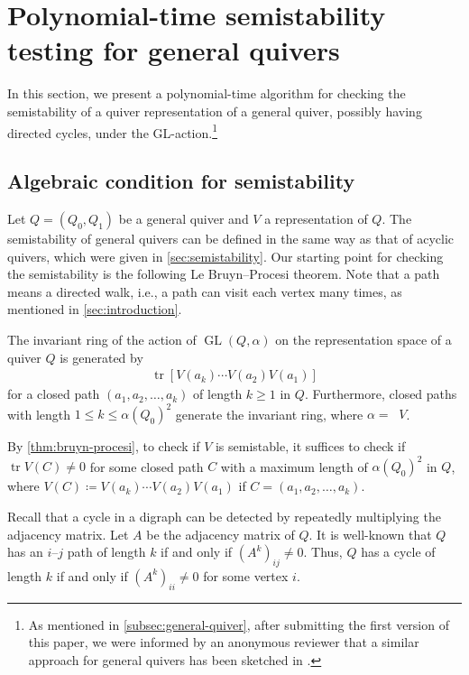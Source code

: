 \documentclass[a4paper,11pt]{article}
\numberwithin{equation}{section}
\DeclareMathOperator{\GL}{GL}
\DeclareMathOperator{\tr}{tr}
\DeclareMathOperator{\dimv}{\underline{dim}}
\begin{document}
\section{Polynomial-time semistability testing for general quivers}\label{sec:general-ss}
In this section, we present a polynomial-time algorithm for checking the semistability of a quiver representation of a general quiver, possibly having directed cycles, under the GL-action.\footnote{As mentioned in \cref{subsec:general-quiver}, after submitting the first version of this paper, we were informed by an anonymous reviewer that a similar approach for general quivers has been sketched in \citet[Theorem~10.8 and the last paragraph of Section~10.2]{Mulmuley2017}.}

\subsection{Algebraic condition for semistability}
Let $Q = (Q_0, Q_1)$ be a general quiver and $V$ a representation of $Q$.
The semistability of general quivers can be defined in the same way as that of acyclic quivers, which were given in \cref{sec:semistability}.
Our starting point for checking the semistability is the following Le Bruyn--Procesi theorem.
Note that a path means a directed walk, i.e., a path can visit each vertex many times, as mentioned in \cref{sec:introduction}.

\begin{theorem}\label{thm:bruyn-procesi}
    The invariant ring of the action of $\GL(Q, \alpha)$ on the representation space of a quiver $Q$ is generated by 
    \begin{align}
        \tr[V(a_k)\cdots V(a_2) V(a_1)]
    \end{align}
    for a closed path $(a_1, a_2, \dots, a_k)$ of length $k \ge 1$ in $Q$.
    Furthermore, closed paths with length $1 \le k \leq \alpha(Q_0)^2$ generate the invariant ring, where $\alpha = \dimv V$.
\end{theorem}

By \cref{thm:bruyn-procesi}, to check if $V$ is semistable, it suffices to check if $\tr V(C) \neq 0$ for some closed path $C$ with a maximum length of ${\alpha(Q_0)}^2$ in $Q$, where $V(C) \coloneqq V(a_k) \dotsb V(a_2)  V(a_1)$ if $C = (a_1, a_2, \dots, a_k)$.

Recall that a cycle in a digraph can be detected by repeatedly multiplying the adjacency matrix.
Let $A$ be the adjacency matrix of $Q$.
It is well-known that $Q$ has an $i$--$j$ path of length $k$ if and only if $(A^k)_{ij} \neq 0$.
Thus, $Q$ has a cycle of length $k$ if and only if $(A^k)_{ii} \neq 0$ for some vertex $i$.
\end{document}
